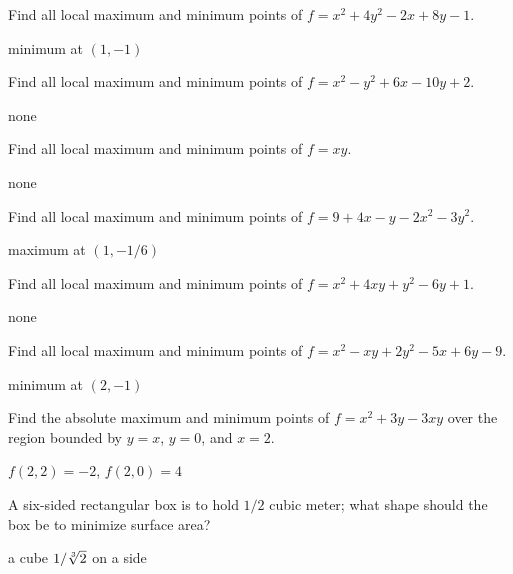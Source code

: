 \begin{enumialphparenastyle}

\begin{ex}
Find all local maximum and minimum points of
$f=x^2+4y^2-2x+8y-1$.
\begin{sol}
minimum at $(1,-1)$
\end{sol}
\end{ex}

\begin{ex}
Find all local maximum and minimum points of
$f=x^2-y^2+6x-10y+2$.
\begin{sol}
none
\end{sol}
\end{ex}

\begin{ex}
Find all local maximum and minimum points of
$f=xy$.
\begin{sol}
none
\end{sol}
\end{ex}

\begin{ex}
Find all local maximum and minimum points of
$f=9+4x-y-2x^2-3y^2$.
\begin{sol}
maximum at $(1,-1/6)$
\end{sol}
\end{ex}

\begin{ex}
Find all local maximum and minimum points of
$f=x^2+4xy+y^2-6y+1$.
\begin{sol}
none
\end{sol}
\end{ex}

\begin{ex}
Find all local maximum and minimum points of
$f=x^2-xy+2y^2-5x+6y-9$.
\begin{sol}
minimum at $(2,-1)$
\end{sol}
\end{ex}

\begin{ex}
Find the absolute maximum and minimum points of
$f=x^2+3y-3xy$ over the region bounded by
$y=x$, $y=0$, and $x=2$.
\begin{sol}
$f(2,2)=-2$, $f(2,0)=4$
\end{sol}
\end{ex}

\begin{ex}
A six-sided rectangular box is to hold $1/2$ cubic meter;
what shape should the box be to minimize surface area?
\begin{sol}
a cube $1/\root 3 \of {2}$ on a side
\end{sol}
\end{ex}


\end{enumialphparenastyle}
